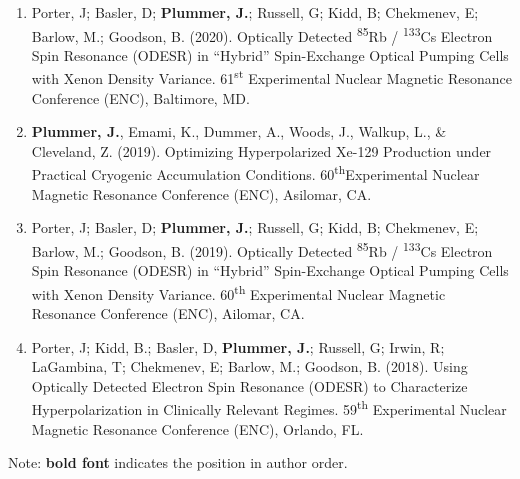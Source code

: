 \documentclass[12pt,]{scrartcl}
\begin{document}
\begin{enumerate}
  \item Porter, J; Basler, D; \textbf{Plummer, J.}; Russell, G; Kidd, B; Chekmenev, E; Barlow, M.; Goodson, B. (2020). Optically Detected \textsuperscript{85}Rb / \textsuperscript{133}Cs Electron Spin Resonance (ODESR) in “Hybrid” Spin-Exchange Optical Pumping Cells with Xenon Density Variance. 61\textsuperscript{st} Experimental Nuclear Magnetic Resonance Conference (ENC), Baltimore, MD. 
  \item \textbf{Plummer, J.}, Emami, K., Dummer, A., Woods, J., Walkup, L., \& Cleveland, Z. (2019). Optimizing Hyperpolarized Xe-129 Production under Practical Cryogenic Accumulation Conditions. 60\textsuperscript{th}Experimental Nuclear Magnetic Resonance Conference (ENC), Asilomar, CA. 
  \item Porter, J; Basler, D; \textbf{Plummer, J.}; Russell, G; Kidd, B; Chekmenev, E; Barlow, M.; Goodson, B. (2019). Optically Detected \textsuperscript{85}Rb / \textsuperscript{133}Cs Electron Spin Resonance (ODESR) in “Hybrid” Spin-Exchange Optical Pumping Cells with Xenon Density Variance. 60\textsuperscript{th} Experimental Nuclear Magnetic Resonance Conference (ENC), Ailomar, CA. 
  \item Porter, J; Kidd, B.; Basler, D, \textbf{Plummer, J.}; Russell, G; Irwin, R; LaGambina, T; Chekmenev, E; Barlow, M.; Goodson, B. (2018). Using Optically Detected Electron Spin Resonance (ODESR) to Characterize Hyperpolarization in Clinically Relevant Regimes. 59\textsuperscript{th} Experimental Nuclear Magnetic Resonance Conference (ENC), Orlando, FL. 

  
\end{enumerate}
Note: \textbf{bold font} indicates the position in author order.




\end{document}
